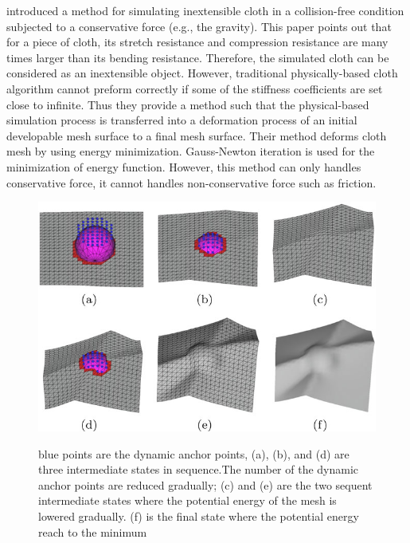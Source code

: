  introduced a method for simulating inextensible cloth in a collision-free condition subjected to a conservative force (e.g., the gravity). This paper points out that for a piece of cloth, its stretch resistance and compression resistance are many times larger than its bending resistance. Therefore, the simulated cloth can be considered as an inextensible object. However, traditional physically-based cloth algorithm cannot preform correctly if some of the stiffness coefficients are set close to infinite. Thus they provide a method such that the physical-based simulation process is transferred into a deformation process of an initial developable mesh surface to a final mesh surface. Their method deforms cloth mesh by using energy minimization. Gauss-Newton iteration is used for the minimization of energy function. However, this method can only handles conservative force, it cannot handles non-conservative force such as friction.

\begin{figure}[ht]
    \centering
	\includegraphics[width=0.7\columnwidth]{../images/chen2010}\\[1cm]
    \caption[Deformation process in ]{blue points are the dynamic anchor points, (a), (b), and (d) are three intermediate states in sequence.The number of the dynamic anchor points are reduced gradually; (c) and (e) are the two sequent intermediate states where the potential energy of the mesh is lowered gradually. (f) is the final state where the potential energy reach to the minimum }
    \label{figure:chen2010}
\end{figure}


%


